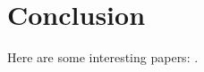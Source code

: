 \chapter{Conclusion}
\label{chap:conclusion}

Here are some interesting papers: \citep{1984MNRAS.208..955F, 1991MNRAS.252..342D, 1992MolPh..75..917G, 1993PhDT.......301C}.